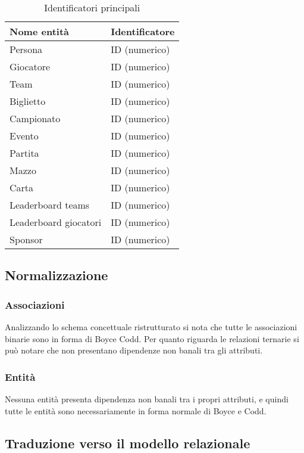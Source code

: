\documentclass{article}
\begin{document}
\begin{table}[H]
    \centering
    \begin{tabularx}{\textwidth} { |X|X| }
    \hline
    \textbf{Nome entità}   & \textbf{Identificatore} \\ \hline
    Persona & ID (numerico) \\ \hline
    Giocatore & ID (numerico) \\ \hline %
    Team & ID (numerico) \\ \hline
    Biglietto & ID (numerico) \\ \hline
    Campionato & ID (numerico) \\ \hline
    Evento & ID (numerico) \\ \hline
    Partita & ID (numerico) \\ \hline
    Mazzo & ID (numerico) \\ \hline
    Carta & ID (numerico) \\ \hline
    Leaderboard teams & ID (numerico) \\ \hline
    Leaderboard giocatori & ID (numerico) \\ \hline
    Sponsor & ID (numerico) \\ \hline
    \end{tabularx}
\caption{Identificatori principali}
\end{table}


\subsection{Normalizzazione}

\subsubsection{Associazioni}
Analizzando lo schema concettuale ristrutturato si nota che tutte le associazioni binarie sono in forma di Boyce Codd. Per quanto riguarda le relazioni ternarie si può notare che non presentano dipendenze non banali tra gli attributi.

\subsubsection{Entità}
Nessuna entità presenta dipendenza non banali tra i propri attributi, e quindi tutte le entità sono necessariamente in forma normale di Boyce e Codd.

\subsection{Traduzione verso il modello relazionale}
\end{document}
